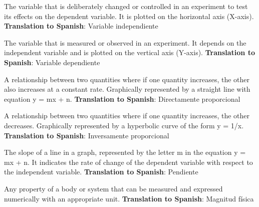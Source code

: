 \begin{vocabulary}
The variable that is deliberately changed or controlled in an experiment to test its effects on the dependent variable. It is plotted on the horizontal axis (X-axis). \newline
\textbf{Translation to Spanish}: Variable independiente \newline
\end{vocabulary}

\begin{vocabulary}
The variable that is measured or observed in an experiment. It depends on the independent variable and is plotted on the vertical axis (Y-axis). \newline
\textbf{Translation to Spanish}: Variable dependiente \newline
\end{vocabulary}

\begin{vocabulary}
A relationship between two quantities where if one quantity increases, the other also increases at a constant rate. Graphically represented by a straight line with equation y = mx + n. \newline
\textbf{Translation to Spanish}: Directamente proporcional \newline
\end{vocabulary}

\begin{vocabulary}
A relationship between two quantities where if one quantity increases, the other decreases. Graphically represented by a hyperbolic curve of the form y = 1/x. \newline
\textbf{Translation to Spanish}: Inversamente proporcional \newline
\end{vocabulary}

\begin{vocabulary}[Gradient]
The slope of a line in a graph, represented by the letter m in the equation y = mx + n. It indicates the rate of change of the dependent variable with respect to the independent variable. \newline
\textbf{Translation to Spanish}: Pendiente \newline
\end{vocabulary}

\begin{vocabulary}
Any property of a body or system that can be measured and expressed numerically with an appropriate unit. \newline
\textbf{Translation to Spanish}: Magnitud física \newline
\end{vocabulary}

